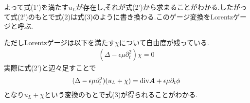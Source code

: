 \documentclass[uplatex,a4j,11pt]{jsarticle}
\begin{document}
よって式(1')を満たす$u_L$が存在し,それが式(2')から求まることがわかる.したがって式(2')のもとで式(2)は式(3)のように書き換わる.このゲージ変換をLorentzゲージと呼ぶ.\par
ただしLorentzゲージは以下を満たす$\chi$について自由度が残っている.
\begin{align}
  (\Delta-\epsilon\mu\partial_t^2)\chi=0\tag{3'}
\end{align}
実際に式(2')と辺々足すことで
\begin{align*}
  (\Delta-\epsilon\mu\partial_t^2)(u_L+\chi)={\rm div}{\bm A}+\epsilon\mu\partial_t\phi
\end{align*}
となり$u_L+\chi$という変換のもとで式(3)が得られることがわかる.
\end{document}
